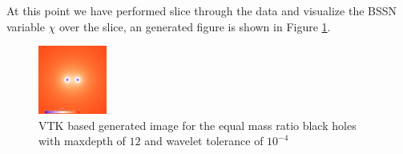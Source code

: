 At this point we have performed slice through the data and visualize the BSSN variable $\chi$ over the slice, an generated figure is shown in Figure \ref{fig:vtk:r1}. 

\begin{figure}[H]
	\centering
	\includegraphics[width=0.2\textwidth]{figs/vtk/r1/img_slice_000000.png}
	\caption{VTK based generated image for the equal mass ratio black holes with maxdepth of $12$ and wavelet tolerance of $10^{-4}$ \label{fig:vtk:r1}}
	\end{figure}
